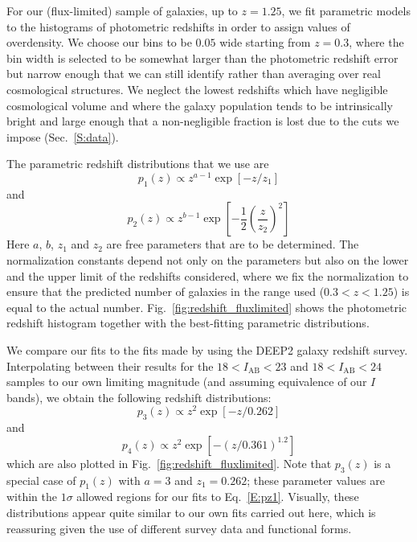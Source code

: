 \documentclass[twocolumn,useAMS,usenatbib]{mn2e}
\newcommand{\rachel}[1]{{\textcolor{red}{#1}}}
\begin{document}
For our (flux-limited) sample of galaxies, up to $z=1.25$, we fit
parametric models to the histograms of photometric redshifts in order
to assign values of overdensity.  We choose our bins to be $0.05$ wide
starting from $z=0.3$, where the bin width is selected to be somewhat
larger than the photometric redshift error but narrow enough that we
can still identify rather than averaging over real cosmological
structures.  We neglect the lowest
redshifts which have negligible cosmological volume and where the
galaxy population tends to be intrinsically bright and large enough
that a non-negligible fraction is lost due to the cuts we impose
(Sec.~\ref{S:data}).

The parametric redshift distributions that we use are
\begin{equation}\label{E:pz1}
 p_1(z) \propto z^{a-1}\exp\left[{-z/z_1}\right]
\end{equation}
and 
\begin{equation}\label{E:pz2}
 p_2(z) \propto z^{b-1}\exp\left[ -\frac{1}{2}\left( \frac{z}{z_2} \right)^2\right]
\end{equation}
Here $a$, $b$, $z_1$ and
$z_2$ are free parameters that are to be determined.  The
normalization constants depend not only on the parameters but also on
the lower and the upper limit of the redshifts considered, where we
fix the normalization to ensure that the predicted number of galaxies
in the range used ($0.3<z<1.25$) is equal to the actual number. 
Fig.~\ref{fig:redshift_fluxlimited} shows the photometric redshift
histogram together with the best-fitting parametric distributions.

We compare our fits to the fits made by \cite{2004ApJ...617..765C} using 
the DEEP2 galaxy redshift survey. Interpolating between their results for the $18<I_\text{AB}<23$
and $18<I_\text{AB}<24$ samples to our own limiting magnitude (and assuming equivalence of our $I$ bands), we obtain the following redshift distributions:
\begin{equation}
 \label{E;pz3}
 p_3(z) \propto z^2 \exp{[-z/0.262]}
\end{equation}
and 
\begin{equation}
 \label{E;pz4}
 p_4(z) \propto z^2 \exp{[-(z/0.361)^{1.2}]}
\end{equation}
which are also plotted in Fig.~\ref{fig:redshift_fluxlimited}.  
Note that $p_3(z)$ is a special case of $p_1(z)$ with $a=3$ and
$z_1=0.262$; these parameter values are within the $1\sigma$ allowed
regions for our fits to Eq.~\ref{E:pz1}.  Visually, these
distributions appear quite similar to our own fits carried out here, which is
reassuring given the use of different survey data and functional forms.
\end{document}
